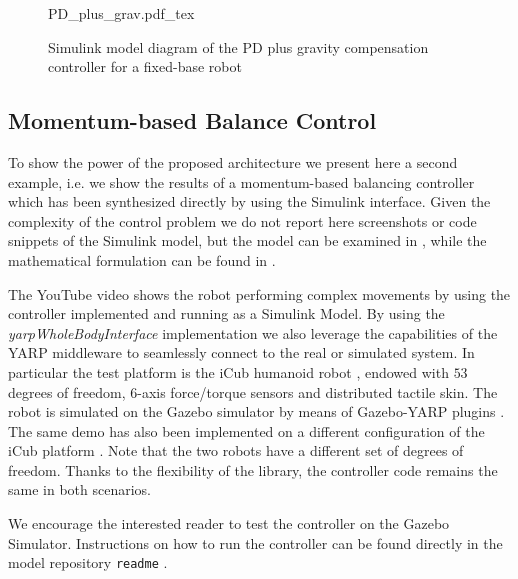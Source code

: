 \begin{figure*}[t]
  \centering
  	\def\svgwidth{\textwidth}
    {PD_plus_grav.pdf_tex}
  \caption{Simulink model diagram of the PD plus gravity compensation controller for a fixed-base robot}
  \label{fig:figs_PD_plus_grav_simulink}
\end{figure*}


\subsection{Momentum-based Balance Control} %
\label{sub:subsection_name}

To show the power of the proposed architecture we present here a second example, i.e. we show the results of a momentum-based balancing controller which has been synthesized directly by using the Simulink interface. 
Given the complexity of the control problem we do not report here screenshots or code snippets of the Simulink model, but the model can be examined in \cite{WBTController}, while the mathematical formulation can be found in \cite{nava16}.

The YouTube\textsuperscript{\textcopyright} video \cite{iCubWithSim} shows the robot performing complex movements by using the controller implemented and running as a Simulink Model.
By using the \emph{yarpWholeBodyInterface} implementation we also leverage the capabilities of the YARP middleware to seamlessly connect to the real or simulated system.
In particular the test platform is the iCub humanoid robot \cite{Metta20101125}, endowed with $53$ degrees of freedom, 6-axis force/torque sensors and distributed tactile skin.
The robot is simulated on the Gazebo simulator \cite{Koenig04} by means of Gazebo-YARP plugins \cite{YarpGazebo2014}.
The same demo has also been implemented on a different configuration of the iCub platform \cite{UtubeHeiCub}.
Note that the two robots have a different set of degrees of freedom.
Thanks to the flexibility of the library, the controller code remains the same in both scenarios.

We encourage the interested reader to test the controller on the Gazebo Simulator. 
Instructions on how to run the controller can be found directly in the model repository {\tt readme} \cite{WBTController}.
